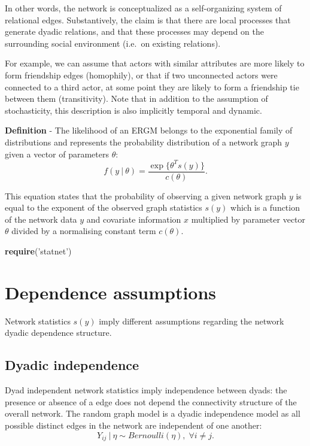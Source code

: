 \documentclass[]{book}
\newenvironment{Shaded}{\begin{snugshade}}{\end{snugshade}}
\newcommand{\KeywordTok}[1]{\textcolor[rgb]{0.13,0.29,0.53}{\textbf{{#1}}}}
\newcommand{\StringTok}[1]{\textcolor[rgb]{0.31,0.60,0.02}{{#1}}}
\newcommand{\NormalTok}[1]{{#1}}
\begin{document}
In other words, the network is conceptualized as a self-organizing
system of relational edges. Substantively, the claim is that there are
local processes that generate dyadic relations, and that these processes
may depend on the surrounding social environment (i.e.~on existing
relations).

For example, we can assume that actors with similar attributes are more
likely to form friendship edges (homophily), or that if two unconnected
actors were connected to a third actor, at some point they are likely to
form a friendship tie between them (transitivity). Note that in addition
to the assumption of stochasticity, this description is also implicitly
temporal and dynamic.

\textbf{Definition} - The likelihood of an ERGM belongs to the
exponential family of distributions and represents the probability
distribution of a network graph \(y\) given a vector of parameters
\(\theta\): \[
f(y\ |\ \theta) = \frac{\exp\{\theta^T s(y)\}}{c(\theta)}.
\]

This equation states that the probability of observing a given network
graph \(y\) is equal to the exponent of the observed graph statistics
\(s(y)\) which is a function of the network data \(y\) and covariate
information \(x\) multiplied by parameter vector \(\theta\) divided by a
normalising constant term \(c(\theta)\).

\begin{Shaded}
\begin{Highlighting}[]
\KeywordTok{require}\NormalTok{(}\StringTok{'statnet'}\NormalTok{)}
\end{Highlighting}
\end{Shaded}

\section{Dependence assumptions}\label{dependence-assumptions}

Network statistics \(s(y)\) imply different assumptions regarding the
network dyadic dependence structure.

\subsection{Dyadic independence}\label{dyadic-independence}

Dyad independent network statistics imply independence between dyads:
the presence or absence of a edge does not depend the connectivity
structure of the overall network. The random graph model is a dyadic
independence model as all possible distinct edges in the network are
independent of one another: \[
Y_{ij}\ |\ \eta \sim Bernoulli(\eta),\; \forall i \ne j.
\]
\end{document}
